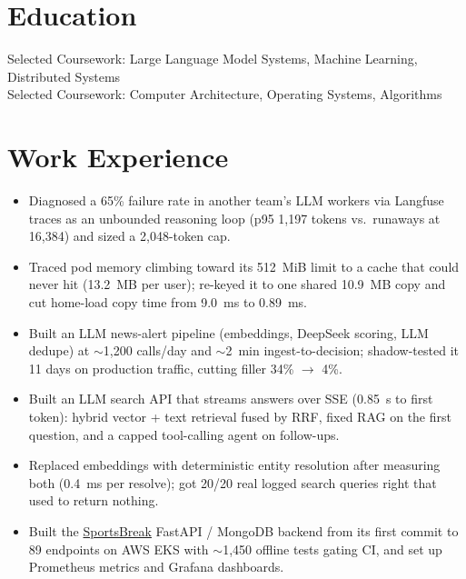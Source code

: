 \documentclass[11pt, letterpaper]{article}
\begin{document}

\section{Education}
Selected Coursework: Large Language Model Systems, Machine Learning, Distributed Systems\\[1pt]
Selected Coursework: Computer Architecture, Operating Systems, Algorithms

\section{Work Experience}
\begin{itemize}
  \item Diagnosed a 65\% failure rate in another team's LLM workers via Langfuse traces as an unbounded reasoning loop (p95 1{,}197 tokens vs.\ runaways at 16{,}384) and sized a 2{,}048-token cap.
  \item Traced pod memory climbing toward its 512~MiB limit to a cache that could never hit (13.2~MB per user); re-keyed it to one shared 10.9~MB copy and cut home-load copy time from 9.0~ms to 0.89~ms.
  \item Built an LLM news-alert pipeline (embeddings, DeepSeek scoring, LLM dedupe) at $\sim$1{,}200 calls/day and $\sim$2~min ingest-to-decision; shadow-tested it 11 days on production traffic, cutting filler 34\% $\to$ 4\%.
  \item Built an LLM search API that streams answers over SSE (0.85~s to first token): hybrid vector + text retrieval fused by RRF, fixed RAG on the first question, and a capped tool-calling agent on follow-ups.
  \item Replaced embeddings with deterministic entity resolution after measuring both (0.4~ms per resolve); got 20/20 real logged search queries right that used to return nothing.
  \item Built the \href{https://apps.apple.com/app/id6762649287}{SportsBreak} FastAPI / MongoDB backend from its first commit to 89 endpoints on AWS EKS with $\sim$1{,}450 offline tests gating CI, and set up Prometheus metrics and Grafana dashboards.
\end{itemize}
\end{document}

